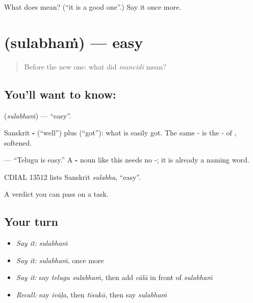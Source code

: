 \begin{tcolorbox}[breakable,colback=teal!4,colframe=teal!35!black,title={Before you move on}]
What does  mean? (\textquotedblleft{}it is a good one\textquotedblright{}.) Say it once more.
\end{tcolorbox}
\section[\texorpdfstring{\te{సులభం} (sulabhaṁ)}{సులభం (sulabhaṁ)}]{ (sulabhaṁ) — easy}

\label{lesson:TE-C76-easy}



\begin{quote}
Before the new one: what did \emph{mancidi} mean?
\end{quote}

\subsection*{You'll want to know: }
\textbf{} (\emph{sulabhaṁ}) — \textquotedblleft{}easy\textquotedblright{}.

Sanskrit \textbf{-} (\textquotedblleft{}well\textquotedblright{}) plus \textbf{} (\textquotedblleft{}got\textquotedblright{}): what is easily got. The same - is the - of , softened.

\textbf{ } — \textquotedblleft{}Telugu is easy.\textquotedblright{} A \textbf{-} noun like this needs no -; it is already a naming word.

CDIAL 13512 lists Sanskrit \emph{sulabha}, \textquotedblleft{}easy\textquotedblright{}.

\begin{grammarlens}[title={What you've built}]
A verdict you can pass on a task.
\end{grammarlens}

\subsection*{Your turn}
\begin{itemize}
\raggedright
  \item \emph{Say it:} \emph{sulabhaṁ}
  \item \emph{Say it:} \emph{sulabhaṁ}, once more
  \item \emph{Say it:} say \emph{telugu sulabhaṁ}, then add \emph{cālā} in front of \emph{sulabhaṁ}
  \item \emph{Recall:} say \emph{ivāḷa}, then \emph{tīsukō}, then say \emph{sulabhaṁ}
\end{itemize}

